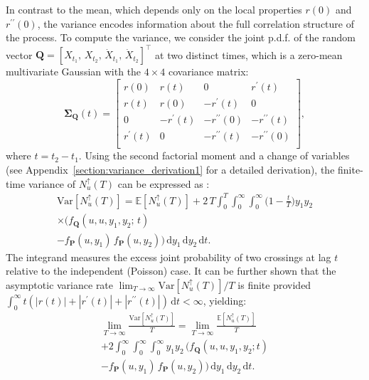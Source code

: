 \documentclass[journal]{IEEEtran}
\theoremstyle{plain}
\theoremstyle{definition}
\theoremstyle{remark}
\newcommand{\E}{\mathbb{E}}
\newcommand{\Nup}{N_u^{\uparrow}(T)}
\newcommand{\dd}{\mathrm{d}}
\newcommand{\Var}{\text{Var}}
\newcommand{\rp}{r^\prime}
\newcommand{\rpp}{r^{\prime\prime}}
\begin{document}
In contrast to the mean, which depends only on the local properties $r(0)$ and $r^{\prime\prime}(0)$, the variance encodes information about the full correlation structure of the process. To compute the variance, we consider the joint p.d.f. of the random vector $\mathbf{Q} = [X_{t_1}, \, X_{t_2}, \, \dot{X}_{t_1}, \, \dot{X}_{t_2}]^\top$ at two distinct times, which is a zero-mean multivariate Gaussian with the $4\times4$ covariance matrix:
\begin{equation}
\renewcommand{\arraystretch}{1.2}
    \boldsymbol{\Sigma}_{\mathbf{Q}}(t) =
                \begin{bmatrix}
                r(0) & r(t) & 0 & \rp(t) \\
                r(t) & r(0) & -\rp(t) & 0 \\
                0 & -\rp(t) & -\rpp(0) & -\rpp(t) \\
                \rp(t) & 0 & -\rpp(t) & -\rpp(0) \\
                \end{bmatrix}, \label{eq:correlation_mat_Q_main}
\end{equation}
where $t=t_2-t_1$. Using the second factorial moment and a change of variables (see Appendix~\ref{section:variance_derivation1} for a detailed derivation), the finite-time variance of $\Nup$ can be expressed as \cite{cramer_leadbetter_book, piterbarg1996asymptotic}:
\begin{multline}
    \Var[\Nup] = \E\left[\Nup\right] + 2 \,T \int_{0}^T \!\!\int_{0}^\infty \!\!\int_{0}^\infty \biggl(1-\frac{t}{T}\biggr) y_1 y_2 \\
    \times\bigl( f_{\mathbf{Q}}(u, u, y_1, y_2; \, t) \\
    - f_{\mathbf{P}}(u,y_1) \, f_{\mathbf{P}}(u,y_2)\bigr)\, \dd y_1 \, \dd y_2 \, \dd t.
\label{eq:variance_formula_triple_integral_main}
\end{multline}
The integrand measures the excess joint probability of two crossings at lag $t$ relative to the independent (Poisson) case. It can be further shown \cite{piterbarg1996asymptotic} that the asymptotic variance rate $\lim_{T \rightarrow \infty}\Var\left[\Nup\right] / T$ is finite provided $\int_0^\infty t \left(\left|r(t)\right| + \left|\rp(t)\right|+ \left|\rpp(t)\right|\right) \, \dd t < \infty$, yielding:
\begin{multline}
    \lim_{T\rightarrow \infty}\frac{\Var\left[\Nup\right]}{T} = \lim_{T\rightarrow \infty}\frac{\E\left[\Nup\right]}{T} \\
    + 2 \int_{0}^\infty \!\!\int_{0}^\infty \!\!\int_{0}^\infty y_1 y_2 \,\bigl( f_{\mathbf{Q}}(u, u, y_1, y_2; t) \\
    - f_{\mathbf{P}}(u,y_1) \, f_{\mathbf{P}}(u,y_2)\bigr)\, \dd y_1 \, \dd y_2 \, \dd t.
\label{eq:variance_formula_triple_integral_main_CLT}
\end{multline}
\end{document}

